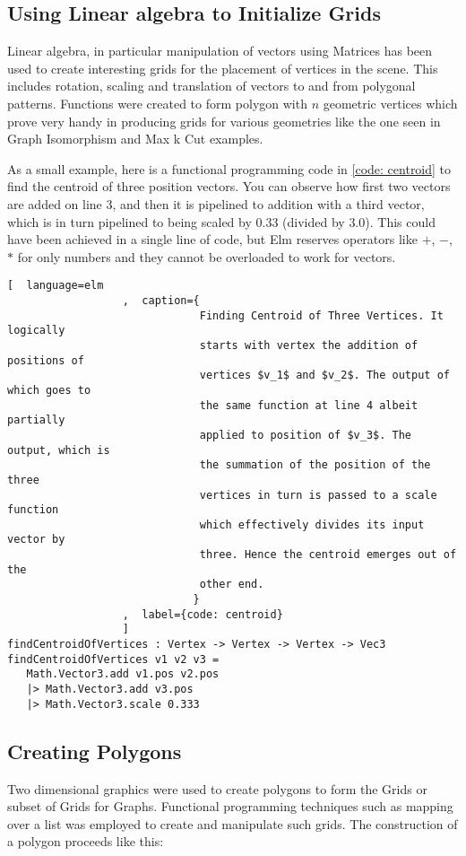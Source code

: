 \subsection{Using Linear algebra to Initialize Grids}
Linear algebra, in particular manipulation of vectors using Matrices has been
used to create interesting grids for the placement of vertices in the scene.
This includes rotation, scaling and translation of vectors to and from polygonal
patterns. Functions were created to form polygon with $n$ geometric vertices
which prove very handy in producing grids for various geometries like
the one seen in Graph Isomorphism and Max k Cut examples.

As a small example, here is a functional programming code in \autoref{code:
centroid} to find the centroid of three position vectors. You can observe
how first two vectors are added on line 3, and then it is pipelined to addition
with a third vector, which is in turn pipelined to being scaled by $0.33$
(divided by $3.0$). This could have been achieved in a single line of code, but
Elm reserves operators like $+$, $-$, $*$ for only numbers and they cannot be
overloaded to work for vectors.


\begin{lstlisting}[  language=elm
                  ,  caption={
                              Finding Centroid of Three Vertices. It logically
                              starts with vertex the addition of positions of
                              vertices $v_1$ and $v_2$. The output of which goes to
                              the same function at line 4 albeit partially
                              applied to position of $v_3$. The output, which is
                              the summation of the position of the three
                              vertices in turn is passed to a scale function
                              which effectively divides its input vector by
                              three. Hence the centroid emerges out of the
                              other end.
                             }
                  ,  label={code: centroid}
                  ]
findCentroidOfVertices : Vertex -> Vertex -> Vertex -> Vec3
findCentroidOfVertices v1 v2 v3 =
   Math.Vector3.add v1.pos v2.pos
   |> Math.Vector3.add v3.pos
   |> Math.Vector3.scale 0.333
\end{lstlisting}

\subsection{Creating Polygons}
Two dimensional graphics were used to create polygons to form the Grids
or subset of Grids for Graphs. Functional programming techniques such as mapping
over a list was employed to create and manipulate such grids. 
The construction of a polygon proceeds like this:

